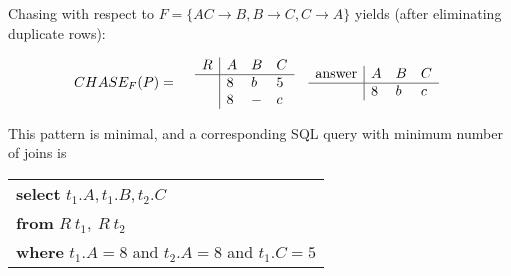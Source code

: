 Chasing with respect to $F = \{AC \rightarrow B, B \rightarrow C, C \rightarrow A\}$ yields (after eliminating duplicate rows):
 
$$
\begin{array}{ll}
CHASE_F(P) = &
\begin{array}{ll}
\begin{array}{l|lll}
R & A & B & C \\ \hline
& 8 & b & 5 \\
& 8 & - & c\\ 
\end{array} &
\begin{array}{l|lll}
\mbox{answer} & A & B & C \\ \hline
&  8 & b & c \\
\end{array}
\end{array}
\end{array}
$$


This pattern is minimal, and 
a corresponding SQL query with minimum number of joins is

\vspace{5mm}
\begin{tabular}{l}
{\bf select} $t_1.A, t_1.B, t_2.C$ \\
{\bf from} $R~t_1, ~R~t_2$ \\
{\bf where} $t_1.A = 8$ and $t_2.A = 8$ and $t_1.C = 5$
\end{tabular}








